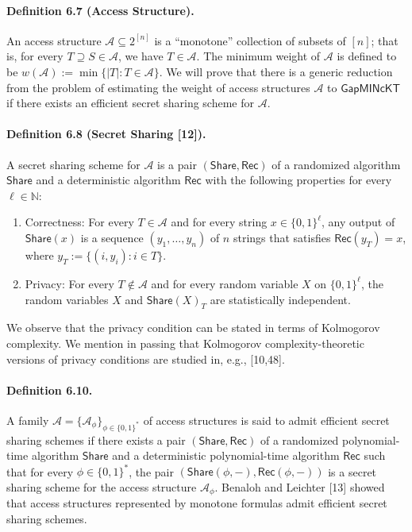 \documentclass[10pt,a4paper]{article}
\begin{document}
\paragraph{Definition 6.7 (Access Structure).}
An access structure $\mathcal A\subseteq2^{[n]}$ is a ``monotone'' collection of subsets of $[n]$; that is, for every $T\supseteq S\in\mathcal A$, we have $T\in\mathcal A$. The minimum weight of $\mathcal A$ is defined to be $w(\mathcal A):=\min\{|T|:T\in\mathcal A\}$.
We will prove that there is a generic reduction from the problem of estimating the weight of access structures $\mathcal A$ to $\mathsf{GapMINcKT}$ if there exists an efficient secret sharing scheme for $\mathcal A$.
\paragraph{Definition 6.8 (Secret Sharing [12]).}
A secret sharing scheme for $\mathcal A$ is a pair $(\mathsf{Share},\mathsf{Rec})$ of a randomized algorithm $\mathsf{Share}$ and a deterministic algorithm $\mathsf{Rec}$ with the following properties for every $\ell\in\mathbb N$:
\begin{enumerate}
\item Correctness: For every $T\in\mathcal A$ and for every string $x\in\{0,1\}^\ell$, any output of $\mathsf{Share}(x)$ is a sequence $(y_1,\ldots,y_n)$ of $n$ strings that satisfies $\mathsf{Rec}(y_T)=x$, where $y_T:=\{(i,y_i):i\in T\}$.
\item Privacy: For every $T\notin\mathcal A$ and for every random variable $X$ on $\{0,1\}^\ell$, the random variables $X$ and $\mathsf{Share}(X)_T$ are statistically independent.
\end{enumerate}
We observe that the privacy condition can be stated in terms of Kolmogorov complexity. We mention in passing that Kolmogorov complexity-theoretic versions of privacy conditions are studied in, e.g., [10,48].
\paragraph{Definition 6.10.}
A family $\mathcal A=\{\mathcal A_\phi\}_{\phi\in\{0,1\}^*}$ of access structures is said to admit efficient secret sharing schemes if there exists a pair $(\mathsf{Share},\mathsf{Rec})$ of a randomized polynomial-time algorithm $\mathsf{Share}$ and a deterministic polynomial-time algorithm $\mathsf{Rec}$ such that for every $\phi\in\{0,1\}^*$, the pair $(\mathsf{Share}(\phi,-),\mathsf{Rec}(\phi,-))$ is a secret sharing scheme for the access structure $\mathcal A_\phi$.
Benaloh and Leichter [13] showed that access structures represented by monotone formulas admit efficient secret sharing schemes.
\end{document}
